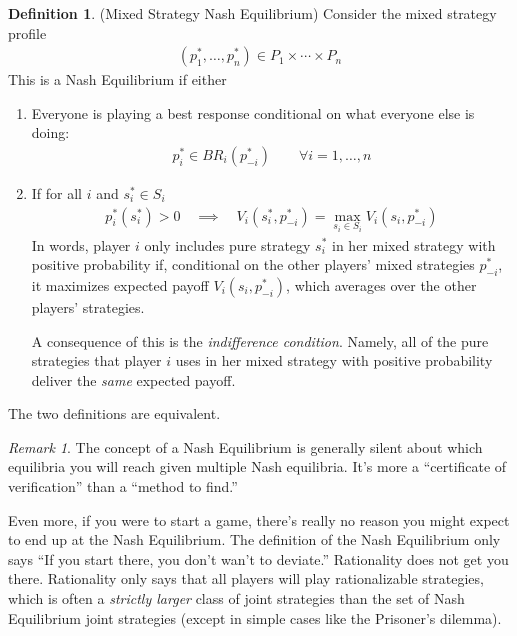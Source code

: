 \documentclass[12pt]{article}
\theoremstyle{plain}
\theoremstyle{definition}
\newtheorem{defn}[thm]{Definition}
\theoremstyle{remark}
\newtheorem*{rmk}{Remark}
\begin{document}
\begin{defn}(Mixed Strategy Nash Equilibrium)
Consider the mixed strategy profile
\begin{align*}
  (p_1^*,\ldots, p_n^*)
  \in
  P_1\times\cdots\times P_{n}
\end{align*}
This is a Nash Equilibrium if either
\begin{enumerate}
  \item
    Everyone is playing a best response conditional on what everyone
    else is doing:
    \begin{align*}
      p^*_i \in BR_i(p_{-i}^*)
      \qquad\forall i = 1,\ldots,n
    \end{align*}

  \item
    If for all $i$ and $s_i^*\in S_i$
    \begin{align*}
      p_i^*(s^*_i)>0
      \quad\implies\quad
      V_i(s_i^*,p_{-i}^*)
      = \max_{s_i\in S_i} V_i(s_i,p_{-i}^*)
    \end{align*}
    In words, player $i$ only includes pure strategy $s_i^*$ in her
    mixed strategy with positive probability if, conditional on the
    other players' mixed strategies $p_{-i}^*$, it maximizes expected
    payoff $V_i(s_i,p_{-i}^*)$, which averages over the other players'
    strategies.

    A consequence of this is the \emph{indifference condition}. Namely,
    all of the pure strategies that player $i$ uses in her mixed
    strategy with positive probability deliver the \emph{same} expected
    payoff.
\end{enumerate}
The two definitions are equivalent.
\end{defn}
\begin{rmk}
The concept of a Nash Equilibrium is generally silent about which
equilibria you will reach given multiple Nash equilibria. It's more a
``certificate of verification'' than a ``method to find.''

Even more, if you were to start a game, there's really no reason you
might expect to end up at the Nash Equilibrium. The definition of the
Nash Equilibrium only says ``If you start there, you don't wan't to
deviate.'' Rationality does not get you there. Rationality only says
that all players will play rationalizable strategies, which is often a
\emph{strictly larger} class of joint strategies than the set of Nash
Equilibrium joint strategies (except in simple cases like the Prisoner's
dilemma).
\end{rmk}
\end{document}
